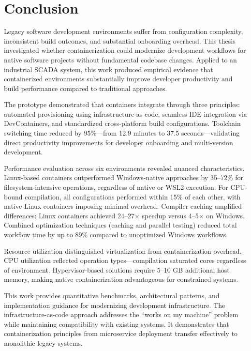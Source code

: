 \chapter{Conclusion}
\label{ch:conclusion}

Legacy software development environments suffer from configuration complexity, inconsistent build outcomes, and substantial onboarding overhead.
This thesis investigated whether containerization could modernize development workflows for native software projects without fundamental codebase changes.
Applied to an industrial SCADA system, this work produced empirical evidence that containerized environments substantially improve developer productivity and build performance compared to traditional approaches.

The prototype demonstrated that containers integrate through three principles: automated provisioning using infrastructure-as-code, seamless IDE integration via DevContainers, and standardized cross-platform build configurations.
Toolchain switching time reduced by 95\%---from 12.9 minutes to 37.5 seconds---validating direct productivity improvements for developer onboarding and multi-version development.

Performance evaluation across six environments revealed nuanced characteristics.
Linux-based containers outperformed Windows-native approaches by 35--72\% for filesystem-intensive operations, regardless of native or WSL2 execution.
For CPU-bound compilation, all configurations performed within 15\% of each other, with native Linux containers imposing minimal overhead.
Compiler caching amplified differences: Linux containers achieved 24--27$\times$ speedup versus 4--5$\times$ on Windows.
Combined optimization techniques (caching and parallel testing) reduced total workflow time by up to 89\% compared to unoptimized Windows workflows.

Resource utilization distinguished virtualization from containerization overhead.
CPU utilization reflected operation types---compilation saturated cores regardless of environment.
Hypervisor-based solutions require 5--10 GB additional host memory, making native containerization advantageous for constrained systems.

\begin{sloppypar}
This work provides quantitative benchmarks, architectural patterns, and implementation guidance for modernizing development infrastructure.
The infrastructure-as-code approach addresses the ``works on my machine'' problem while maintaining compatibility with existing systems.
It demonstrates that containerization principles from microservice deployment transfer effectively to monolithic legacy systems.
\end{sloppypar}

